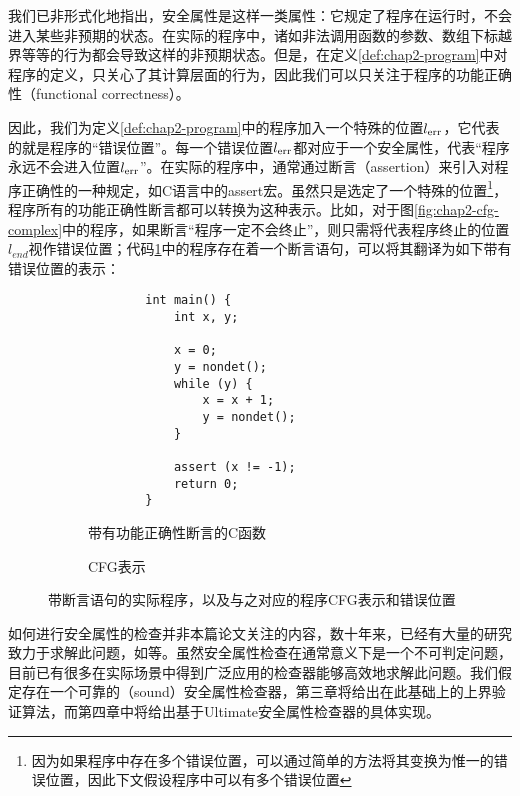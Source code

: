 我们已非形式化地指出，安全属性是这样一类属性：它规定了程序在运行时，不会进入某些非预期的状态。在实际的程序中，诸如非法调用函数的参数、数组下标越界等等的行为都会导致这样的非预期状态。但是，在定义\ref{def:chap2-program}中对程序的定义，只关心了其计算层面的行为，因此我们可以只关注于程序的功能正确性（functional
correctness）。

因此，我们为定义\ref{def:chap2-program}中的程序加入一个特殊的位置$l_{\operatorname{err}}$，它代表的就是程序的“错误位置”。每一个错误位置$l_{\operatorname{err}}$都对应于一个安全属性，代表“程序永远不会进入位置$l_{\operatorname{err}}$”。在实际的程序中，通常通过断言（assertion）来引入对程序正确性的一种规定，如C语言中的assert宏。虽然只是选定了一个特殊的位置\footnote{因为如果程序中存在多个错误位置，可以通过简单的方法将其变换为惟一的错误位置，因此下文假设程序中可以有多个错误位置}，程序所有的功能正确性断言都可以转换为这种表示。比如，对于图\ref{fig:chap2-cfg-complex}中的程序，如果断言“程序一定不会终止”，则只需将代表程序终止的位置$l_{end}$视作错误位置；代码\ref{fig:chap2-cfg-assert}中的程序存在着一个断言语句，可以将其翻译为如下带有错误位置的表示：

\begin{figure}
  \begin{subfigure}[b]{.5\linewidth}
    \begin{verbatim}
        int main() {
            int x, y;
        
            x = 0;
            y = nondet();
            while (y) {
                x = x + 1;
                y = nondet();
            }
        
            assert (x != -1);
            return 0;
        }
    \end{verbatim}
    \caption{带有功能正确性断言的C函数}
  \end{subfigure}
  \begin{subfigure}[b]{.5\linewidth}
    \centering
    \caption{CFG表示}
  \end{subfigure}
  \caption{带断言语句的实际程序，以及与之对应的程序CFG表示和错误位置}
  \label{fig:chap2-cfg-assert}
\end{figure}

如何进行安全属性的检查并非本篇论文关注的内容，数十年来，已经有大量的研究致力于求解此问题，如\cite{heizmann_software_2013,bakhirkin_recurrent_2016}等。虽然安全属性检查在通常意义下是一个不可判定问题，目前已有很多在实际场景中得到广泛应用的检查器能够高效地求解此问题。我们假定存在一个可靠的（sound）安全属性检查器，第三章将给出在此基础上的上界验证算法，而第四章中将给出基于Ultimate安全属性检查器的具体实现。
